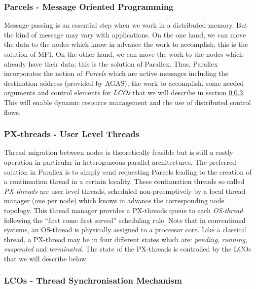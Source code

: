 \documentclass{llncs}
\begin{document}
\subsubsection{Parcels - Message Oriented Programming}
Message passing is an essential step when we work in a distributed memory. But
the kind of message may vary with applications. On the one hand, we can move
the data to the nodes which know in advance the work to accomplish; this is the
solution of MPI. On the other hand, we can move the work to the nodes which
already have their data; this is the solution of Parallex. Thus, Parallex
incorporates the notion of \emph{Parcels} \cite{Parallex} which are active
messages including the destination address (provided by AGAS), the work to
accomplish, some needed arguments and control elements for \emph{LCOs} that we
will describe in section \ref{lcos}. This will enable dynamic resource
management and the use of distributed control flows.

\subsubsection{PX-threads - User Level Threads}
Thread migration between nodes is theoretically feasible but is still a costly
operation in particular in heterogeneous parallel architectures. The preferred
solution in Parallex is to simply send requesting Parcels leading to the
creation of a continuation thread in a certain locality. These continuation
threads so called \emph{PX-threads} \cite{Parallex} are user level threads,
scheduled non-preemptively by a local thread manager (one per node) which knows
in advance the corresponding node topology. This thread manager provides a
PX-threads queue to each \emph{OS-thread} \cite{Parallex} following the
\enquote{first come first served} scheduling rule. Note that in conventional
systems, an OS-thread is physically assigned to a processor core. Like a
classical thread, a PX-thread may be in four different states which are:
\emph{pending}, \emph{running}, \emph{suspended} and \emph{terminated}. The
state of the PX-threads is controlled by the LCOs that we will describe below.

\subsubsection{LCOs - Thread Synchronisation Mechanism}\label{lcos}
\end{document}
